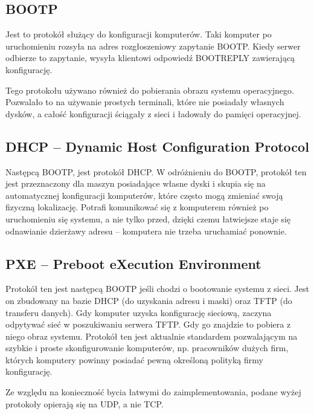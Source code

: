 \subsection{BOOTP}
Jest to protokół służący do konfiguracji komputerów.
Taki komputer po uruchomieniu rozsyła na adres rozgłoszeniowy zapytanie BOOTP.
Kiedy serwer odbierze to zapytanie, wysyła klientowi odpowiedź BOOTREPLY zawierającą konfigurację.

Tego protokołu używano również do pobierania obrazu systemu operacyjnego.
Pozwalało to na używanie prostych terminali, które nie posiadały własnych dysków, a całość konfiguracji ściągały z sieci i ładowały do pamięci operacyjnej.

\subsection{DHCP -- Dynamic Host Configuration Protocol}
Następcą BOOTP, jest protokół DHCP.
W odróżnieniu do BOOTP, protokół ten jest przeznaczony dla maszyn posiadające własne dyski i skupia się na automatycznej konfiguracji komputerów, które często mogą zmieniać swoją fizyczną lokalizację.
Potrafi komunikować się z komputerem również po uruchomieniu się systemu, a nie tylko przed, dzięki czemu łatwiejsze staje się odnawianie dzierżawy adresu -- komputera nie trzeba uruchamiać ponownie.

\subsection{PXE -- Preboot eXecution Environment}
Protokół ten jest następcą BOOTP jeśli chodzi o bootowanie systemu z sieci.
Jest on zbudowany na bazie DHCP (do uzyskania adresu i maski) oraz TFTP (do transferu danych).
Gdy komputer uzyska konfigurację sieciową, zaczyna odpytywać sieć w poszukiwaniu serwera TFTP.
Gdy go znajdzie to pobiera z niego obraz systemu.
Protokół ten jest aktualnie standardem pozwalającym na szybkie i proste skonfigurowanie komputerów, np. pracowników dużych firm, których komputery powinny posiadać pewną określoną polityką firmy konfigurację.

Ze względu na konieczność bycia łatwymi do zaimplementowania, podane wyżej protokoły opierają się na UDP, a nie TCP.